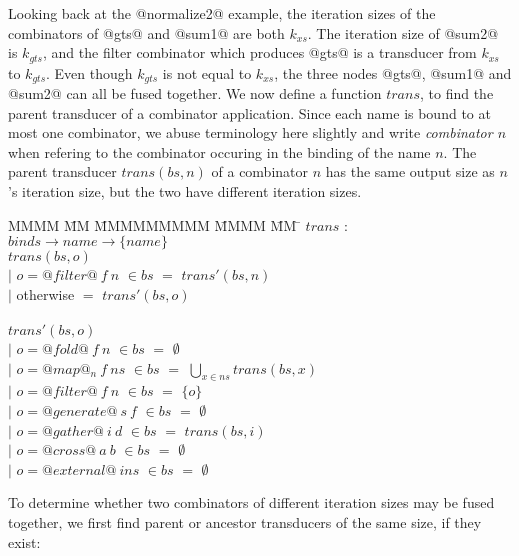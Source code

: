 Looking back at the @normalize2@ example, the iteration sizes of the combinators of @gts@ and @sum1@ are both $k_{xs}$.
The iteration size of @sum2@ is $k_{gts}$, and the filter combinator which produces @gts@ is a transducer from $k_{xs}$ to $k_{gts}$. 
Even though $k_{gts}$ is not equal to $k_{xs}$, the three nodes @gts@, @sum1@ and @sum2@ can all be fused together.
We now define a function $trans$, to find the parent transducer of a combinator application. Since each name is bound to at most one combinator, we abuse terminology here slightly and write \emph{combinator $n$} when refering to the combinator occuring in the binding of the name $n$.
The parent transducer $trans(bs, n)$ of a combinator $n$ has the same output size as $n$'s iteration size, but the two have different iteration sizes.


\begin{tabbing}
MMMM \= MM \= MMMMMMMMM \= MMMM \= MM \= \kill
$trans$  \>$:$\> $binds \rightarrow name \rightarrow \{name\}$ \\
$trans(bs,o)$    \\
            \> $|$ \> $o = @filter@~f~n$    \> $\in bs$ \> $=$ \> $trans'(bs,n)$ \\
            \> $|$ \> otherwise             \>          \> $=$ \> $trans'(bs,o)$ \\
\\
$trans'(bs,o)$    \\
            \> $|$ \> $o = @fold@~f~n$      \> $\in bs$ \> $=$ \> $\emptyset$ \\
            \> $|$ \> $o = @map@_n~f~ns$    \> $\in bs$ \> $=$ \> $\bigcup_{x \in ns} trans(bs, x)$ \\
            \> $|$ \> $o = @filter@~f~n$    \> $\in bs$ \> $=$ \> $\{o\}$       \\
            \> $|$ \> $o = @generate@~s~f$  \> $\in bs$ \> $=$ \> $\emptyset$ \\
            \> $|$ \> $o = @gather@~i~d$    \> $\in bs$ \> $=$ \> $trans(bs,i)$ \\
            \> $|$ \> $o = @cross@~a~b$     \> $\in bs$ \> $=$ \> $\emptyset$ \\
            \> $|$ \> $o = @external@~ins$  \> $\in bs$ \> $=$ \> $\emptyset$ \\
\end{tabbing}

To determine whether two combinators of different iteration sizes may be fused together, we first find parent or ancestor transducers of the same size, if they exist:


